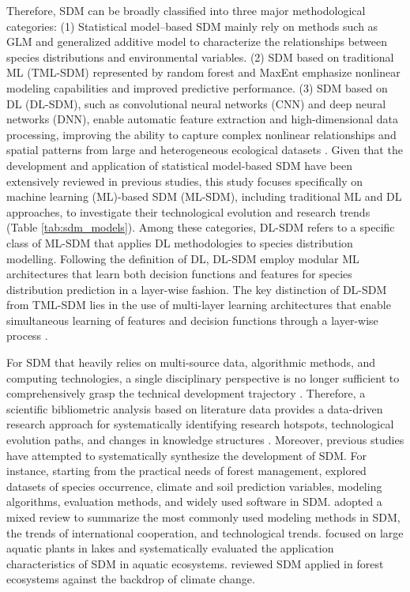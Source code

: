 \documentclass[authoryear,preprint,review,12pt]{elsarticle}
\begin{document}
Therefore, SDM can be broadly classified into three major methodological categories: (1) Statistical model–based SDM mainly rely on methods such as GLM and generalized additive model to characterize the relationships between species distributions and environmental variables. (2) SDM based on traditional ML (TML-SDM) represented by random forest and MaxEnt emphasize nonlinear modeling capabilities and improved predictive performance. (3) SDM based on DL (DL-SDM), such as convolutional neural networks (CNN) and deep neural networks (DNN), enable automatic feature extraction and high-dimensional data processing, improving the ability to capture complex nonlinear relationships and spatial patterns from large and heterogeneous ecological datasets \citep{guisan2000predictive,elith2006novel,robinson2018correcting}. Given that the development and application of statistical model-based SDM have been extensively reviewed in previous studies, this study focuses specifically on machine learning (ML)-based SDM (ML-SDM), including traditional ML and DL approaches, to investigate their technological evolution and research trends \citep{elith2009species, guisan2000predictive} (Table \ref{tab:sdm_models}). Among these categories, DL-SDM refers to a specific class of ML-SDM that applies DL methodologies to species distribution modelling. Following the definition of DL, DL-SDM employ modular ML architectures that learn both decision functions and features for species distribution prediction in a layer-wise fashion. The key distinction of DL-SDM from TML-SDM lies in the use of multi-layer learning architectures that enable simultaneous learning of features and decision functions through a layer-wise process \citep{kellenberger2026performance, lecun2015deep}.

For SDM that heavily relies on multi-source data, algorithmic methods, and computing technologies, a single disciplinary perspective is no longer sufficient to comprehensively grasp the technical development trajectory \citep{guisan2005predicting}. Therefore, a scientific bibliometric analysis based on literature data provides a data-driven research approach for systematically identifying research hotspots, technological evolution paths, and changes in knowledge structures \citep{li2022scientometric,chen2017science}. Moreover, previous studies have attempted to systematically synthesize the development of SDM. For instance, \cite{pecchi2019species} starting from the practical needs of forest management, explored datasets of species occurrence, climate and soil prediction variables, modeling algorithms, evaluation methods, and widely used software in SDM. \cite{vasconcelos2024advances} adopted a mixed review to summarize the most commonly used modeling methods in SDM, the trends of international cooperation, and technological trends. \cite{kroth2025habitat} focused on large aquatic plants in lakes and systematically evaluated the application characteristics of SDM in aquatic ecosystems. \cite{tumer2026two} reviewed SDM applied in forest ecosystems against the backdrop of climate change.
\end{document}
